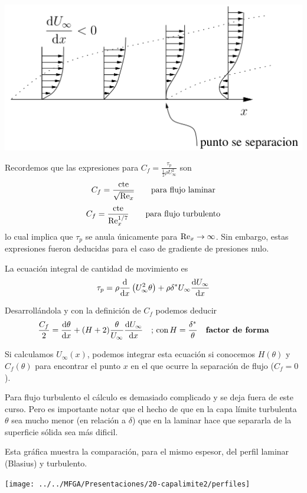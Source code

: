 	
\begin{center}
	\includegraphics[width=0.7\linewidth]{TeX_files/chapter08-CapaLimite/sepa}
\end{center}


	
	Recordemos que las expresiones para $C_{f}=\frac{\tau_{p}}{\frac{1}{2}\rho U_{\infty}^{2}}$
	son 
	\[
	C_{f}=\frac{\text{cte}}{\sqrt{\text{Re}_{x}}}\qquad\text{para flujo laminar}
	\]
	\[
	C_{f}=\frac{\text{cte}}{\text{Re}_{x}^{1/7}}\qquad\text{para flujo turbulento}
	\]
	lo cual implica que $\tau_{p}$ se anula únicamente para $\text{Re}_{x}\rightarrow\infty$.
	Sin embargo, estas expresiones fueron deducidas para el caso de gradiente
	de presiones nulo.
	
	La ecuación integral de cantidad de movimiento es 
	\[
	\tau_{p}=\rho\frac{\textrm{d} }{\textrm{d} x}\left(U_{\infty}^{2}\theta\right)+\rho\delta^{*}U_{\infty}\frac{\textrm{d} U_{\infty}}{\textrm{d} x}
	\]
	
	Desarrollándola y con la definición de $C_{f}$ podemos deducir 
	\[
	\frac{C_{f}}{2}=\frac{\textrm{d} \theta}{\textrm{d} x}+(H+2)\frac{\theta}{U_{\infty}}\frac{\textrm{d} U_{\infty}}{\textrm{d} x}\quad\text{; con}\,H=\frac{\delta^{*}}{\theta}\quad\textbf{factor de forma}
	\]
	
	
	Si calculamos $U_{\infty}(x)$, podemos integrar esta ecuación si
	conocemos $H(\theta)$ y $C_{f}(\theta)$ para encontrar el punto
	$x$ en el que ocurre la separación de flujo ($C_{f}=0$).\medskip{}
	


			Para flujo turbulento el cálculo es demasiado complicado y se deja
			fuera de este curso. Pero es importante notar que el hecho de que
			en la capa límite turbulenta $\theta$ sea mucho menor (en relación
			a $\delta$) que en la laminar hace que separarla de la superficie
			sólida sea más dificil. %

Esta gráfica muestra la comparación, para el mismo espesor, del perfil laminar (Blasius) y turbulento.

\begin{center}
	\texttt{[image: ../../MFGA/Presentaciones/20-capalimite2/perfiles]}
\end{center}


